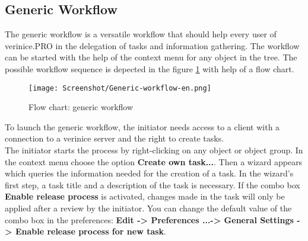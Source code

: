 \documentclass[a4paper,10pt]{book}
\begin{document}
\subsection{Generic Workflow}
The generic workflow is a versatile workflow that should help every user of verinice.\textsc{PRO} in the delegation of tasks and information gathering.
The workflow can be started with the help of the context menu for any object in the tree.
The possible workflow sequence is depected in the figure \ref{Flow chart: generic workflow} with help of a flow chart.
\begin{figure}[htb!]
  \centering
  \texttt{[image: Screenshot/Generic-workflow-en.png]}
  \caption{\label{Flow chart: generic workflow} Flow chart: generic workflow}
\end{figure}
To launch the generic workflow, the initiator needs access to a client with a connection to a verinice server and the right to create tasks.
\newline\\
The initiator starts the process by right-clicking on any object or object group.
In the context menu choose the option \textbf{Create own task...}. Then a wizard appears which queries the information needed for the creation of a task. In the wizard's first step, a task title and a description of the task is necessary. If the combo box \textbf{Enable release process} is activated, changes made in the task will only be applied after a review by the initiator. You can change the default value of the combo box in the preferences: \textbf{Edit -> Preferences ...-> General Settings -> Enable release process for new task}.
\end{document}

